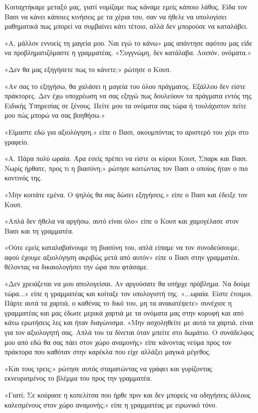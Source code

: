 \documentclass[12pt,twoside, openany]{book}
\begin{document}
Κοιταχτήκαμε μεταξύ μας, γιατί νομίζαμε πως κάναμε εμείς κάποιο λάθος. Είδα τον Βασι να κάνει κάποιες κινήσεις με τα χέρια του, σαν να ήθελε να υπολογίσει μαθηματικά πως μπορεί να συμβαίνει κάτι τέτοιο, αλλά δεν μπορούσε να καταλάβει.

«Α, μάλλον εννοείς τη μαγεία μου. Ναι εγώ το κάνω» μας απάντησε αφότου μας είδε να προβληματιζόμαστε η γραμματέας. «Συγγνώμη, δεν κατάλαβα. Λοιπόν, ονόματα.»

«Δεν θα μας εξηγήσετε πως το κάνετε;» ρώτησε ο Κουπ.

«Αν σας το εξηγήσω, θα χαλάσει η μαγεία του όλου πράγματος. Εξάλλου δεν είστε πράκτορες. Δεν έχω υποχρέωση να σας εξηγώ πως δουλεύουν τα πράγματα εντός της Ειδικής Υπηρεσίας σε ξένους. Πείτε μου τα ονόματα σας τώρα ή τουλάχιστον πείτε μου πώς μπορώ να σας βοηθήσω.»

«Είμαστε εδώ για αξιολόγηση.» είπε ο Βασι, ακουμπόντας το αριστερό του χέρι στο γραφείο.

«Α. Πάρα πολύ ωραία. Άρα εσείς πρέπει να είστε οι κύριοι Κουπ, Σπαρκ και Βασι. Νωρίς ήρθατε, προς τι η βιασύνη;» ρώτησε κοιτώντας τον Βασι ο οποίος ήταν ο πιο κοντινός της.

«Μην κοιτάτε εμένα. Ο ψηλός θα σας δώσει εξηγήσεις.» είπε ο Βασι και έδειξε τον Κουπ.

«Απλά δεν ήθελα να αργήσω, αυτό είναι όλο» είπε ο Κουπ και χαμογέλασε στον Βασι και τη γραμματέα.

«Ούτε εμείς καταλαβαίνουμε τη βιασύνη του, απλά είπαμε να τον συνοδεύσουμε, αφού έχουμε αξιολόγηση ακριβώς μετά από αυτόν» είπε ο Βασι στην γραμματέα, θέλοντας να δικαιολογήσει την ώρα που φτάσαμε.

«Δεν χρειάζεται να μου απολογείσαι. Αν αργούσατε θα υπήρχε πρόβλημα. Να δούμε τώρα...» είπε η γραμματέας και κοίταξε τον υπολογιστή της. «...ωραία. Είστε έτοιμοι. Πάρτε αυτά τα χαρτιά, ο καθένας το δικό του, μη τα ανακατέψετε» συνέχισε η γραμματέας και μας έδωσε μερικά χαρτιά με τα ονόματα μας στην κορυφή και από κάτω ερωτήσεις λες και ήταν διαγώνισμα. «Μην ασχοληθείτε με αυτά τα χαρτιά, είναι για τον αξιολογητή σας. Απλά του τα δίνεται όταν μπείτε στο δωμάτιο. Ο συνάδελφος μου από εδώ θα σας πάει στον χώρο αναμονής» είπε κάνοντας νεύμα προς τον πράκτορα που καθόταν στην καρέκλα που είχε αλλάξει μαγικά μέγεθος.

«Και τους τρεις;» ρώτησε αυτός σταματώντας να γράφει και γυρίζοντας εκνευρισμένος το βλέμμα του προς την γραμματέα.

«Γιατί; Σε κούρασε η κοπελίτσα που ήρθε πριν και δεν μπορείς να οδηγήσεις άλλους καλεσμένους στον χώρο αναμονής;» είπε η γραμματέας με ειρωνικό τόνο.
\end{document}
